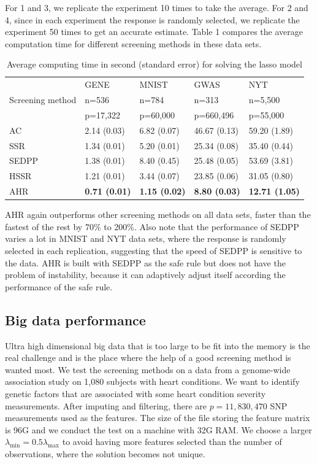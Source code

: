 For 1 and 3, we replicate the experiment 10 times to take the average. For 2 and 4, since in each experiment the response is randomly selected, we replicate the experiment 50 times to get an accurate estimate. Table 1 compares the average computation time for different screening methods in these data sets.

\begin{table}[H]
\centering
\begin{tabular}{l|l|l|l|l}
\hline
 & GENE & MNIST & GWAS & NYT \\
Screening method & n=536 & n=784 & n=313 & n=5,500 \\
 & p=17,322 & p=60,000 & p=660,496 & p=55,000 \\ \hline
AC & 2.14 (0.03) & 6.82 (0.07) & 46.67 (0.13) & 59.20 (1.89) \\
SSR & 1.34 (0.01) & 5.20 (0.01) & 25.34 (0.08) & 35.40 (0.44) \\
SEDPP & 1.38 (0.01) & 8.40 (0.45) & 25.48 (0.05) & 53.69 (3.81) \\
HSSR & 1.21 (0.01) & 3.44 (0.07) & 23.85 (0.06) & 31.05 (0.80) \\
AHR & \textbf{0.71 (0.01)} & \textbf{1.15 (0.02)} & \textbf{8.80 (0.03)} & \textbf{12.71 (1.05)} \\\hline
\end{tabular}
\caption{Average computing time in second (standard error) for solving the lasso model}
\end{table}

AHR again outperforms other screening methods on all data sets, faster than the fastest of the rest by 70\% to 200\%. Also note that the performance of SEDPP varies a lot in MNIST and NYT data sets, where the response is randomly selected in each replication, suggesting that the speed of SEDPP is sensitive to the data. AHR is built with SEDPP as the safe rule but does not have the problem of instability, because it can adaptively adjust itself according the performance of the safe rule.



\subsection{Big data performance}

Ultra high dimensional big data that is too large to be fit into the memory is the real challenge and is the place where the help of a good screening method is wanted most. We test the screening methods on a data from a genome-wide association study on 1,080 subjects with heart conditions. We want to identify genetic factors that are associated with some heart condition severity measurements. After imputing and filtering, there are $p=11,830,470$ SNP measurements used as the features. The size of the file storing the feature matrix is 96G and we conduct the test on a machine with 32G RAM. We choose a larger $\lambda_{\min} =0.5\lambda_{\max}$ to avoid having more features selected than the number of observations, where the solution becomes not unique.

